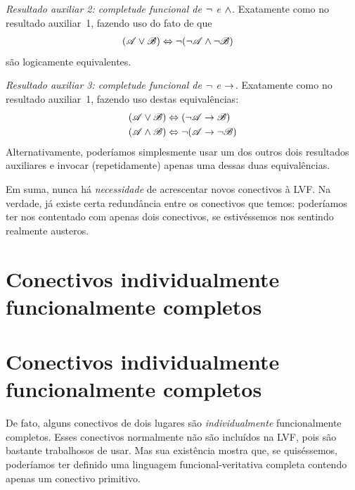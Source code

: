 \emph{Resultado auxiliar 2: completude funcional de $\neg$ e $\wedge$.} Exatamente como no resultado auxiliar~1, fazendo uso do fato de que
		\begin{align*}
		(\mathscr{A} \vee \mathscr{B}) & \Leftrightarrow \neg(\neg \mathscr{A} \wedge\neg \mathscr{B})
		\end{align*}
são logicamente equivalentes.

\emph{Resultado auxiliar 3: completude funcional de $\neg$ e $\rightarrow$.} Exatamente como no resultado auxiliar~1, fazendo uso destas equivalências:
		\begin{align*}
		(\mathscr{A} \vee \mathscr{B}) &\Leftrightarrow (\neg \mathscr{A} \rightarrow \mathscr{B})\\
		(\mathscr{A} \wedge \mathscr{B}) &\Leftrightarrow \neg(\mathscr{A} \rightarrow \neg\mathscr{B})
		\end{align*}
Alternativamente, poderíamos simplesmente usar um dos outros dois resultados auxiliares e invocar (repetidamente) apenas uma dessas duas equivalências.

Em suma, nunca há \emph{necessidade} de acrescentar novos conectivos à LVF. Na verdade, já existe certa redundância entre os conectivos que temos: poderíamos ter nos contentado com apenas dois conectivos, se estivéssemos nos sentindo realmente austeros.

\ifHTMLtarget
\section{Conectivos individualmente funcionalmente completos}
\else
\section[Conectivos funcionalmente completos][Conectivos funcionalmente completos]{Conectivos individualmente funcionalmente completos}
\fi

De fato, alguns conectivos de dois lugares são \emph{individualmente} funcionalmente completos. Esses conectivos normalmente não são incluídos na LVF, pois são bastante trabalhosos de usar. Mas sua existência mostra que, se quiséssemos, poderíamos ter definido uma linguagem funcional-veritativa completa contendo apenas um conectivo primitivo.

